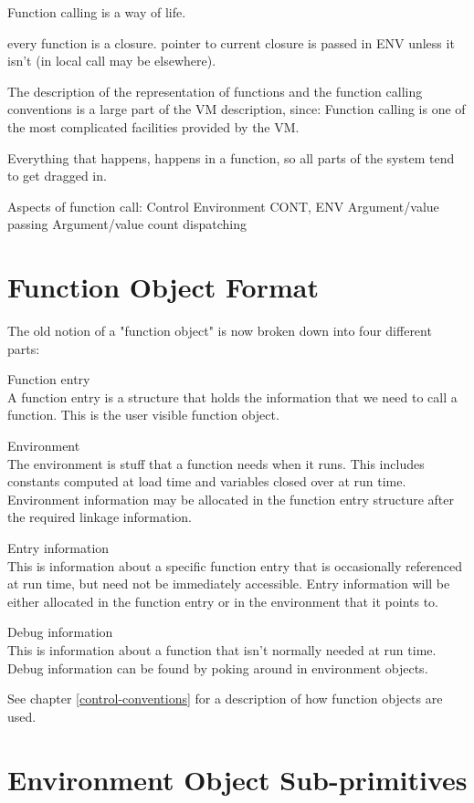 {\begin{itemize, spread 0, spacing 1}
Function calling is a way of life.  

every function is a closure.  pointer to current closure is passed in ENV
unless it isn't (in local call may be elsewhere).

The description of the representation of functions and the function calling
conventions is a large part of the VM description, since:
    Function calling is one of the most complicated facilities provided by the
    VM.

    Everything that happens, happens in a function, so all parts of the system
    tend to get dragged in.


Aspects of function call:
    Control
    Environment CONT, ENV
    Argument/value passing
    Argument/value count dispatching




\section{Function Object Format}
\label{Fn-Format}

The old notion of a "function object" is now broken down into four different
parts:
\begin{description}
Function entry\\A function entry is a structure that holds the information
that we need to call a function.  This is the user visible function object.

Environment\\The environment is stuff that a function needs when it runs.
This includes constants computed at load time and variables closed over at run
time.  Environment information may be allocated in the function entry structure
after the required linkage information.

Entry information\\This is information about a specific function entry that is
occasionally referenced at run time, but need not be immediately accessible.
Entry information will be either allocated in the function entry
or in the environment that it points to.

Debug information\\This is information about a function that isn't normally
needed at run time.  Debug information can be found by poking around in
environment objects.
\end{description}
See chapter \ref{control-conventions} for a description of how function objects
are used.


\section{Environment Object Sub-primitives}


\end{itemize, spread 0, spacing 1}}
